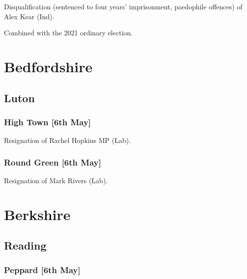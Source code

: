 \documentclass[a4paper,openany]{book}
\begin{document}
\begin{resultsiii}
Disqualification (sentenced to four years' imprisonment, paedophile offences) of Alex Kear (Ind).

Combined with the 2021 ordinary election.

\section{Bedfordshire}

\subsection*{Luton}

\subsubsection*{High Town \hspace*{\fill}\nolinebreak[1]%
	\enspace\hspace*{\fill}
	[6th May]}


Resignation of Rachel Hopkins MP (Lab).

\subsubsection*{Round Green \hspace*{\fill}\nolinebreak[1]%
	\enspace\hspace*{\fill}
	[6th May]}


Resignation of Mark Rivers (Lab).

\section{Berkshire}

\subsection*{Reading}

\subsubsection*{Peppard \hspace*{\fill}\nolinebreak[1]%
	\enspace\hspace*{\fill}
	[6th May]}


\end{resultsiii}
\end{document}
